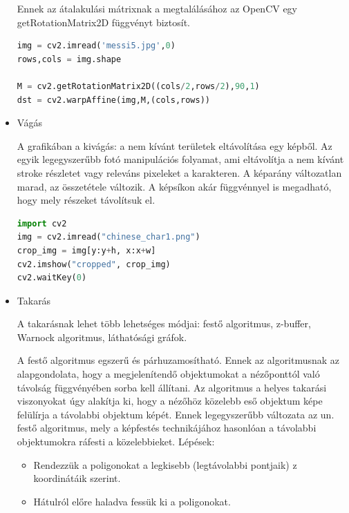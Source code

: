 \begin{itemize}
Ennek az átalakulási mátrixnak a megtalálásához az OpenCV egy getRotationMatrix2D függvényt biztosít.

\begin{lstlisting}[language=Python]
img = cv2.imread('messi5.jpg',0)
rows,cols = img.shape

M = cv2.getRotationMatrix2D((cols/2,rows/2),90,1)
dst = cv2.warpAffine(img,M,(cols,rows))
\end{lstlisting}

\item Vágás

A grafikában a kivágás: a nem kívánt területek eltávolítása egy képből. Az egyik legegyszerűbb fotó manipulációs folyamat, ami eltávolítja a nem kívánt stroke részletet vagy releváns pixeleket a karakteren. A képarány változatlan marad, az összetétele változik. A képsíkon akár függvénnyel is megadható, hogy mely részeket távolítsuk el.

\begin{lstlisting}[language=Python]
import cv2
img = cv2.imread("chinese_char1.png")
crop_img = img[y:y+h, x:x+w]
cv2.imshow("cropped", crop_img)
cv2.waitKey(0)
\end{lstlisting}

\item Takarás

A takarásnak lehet több lehetséges módjai: festő algoritmus, z-buffer, Warnock algoritmus, láthatósági gráfok.

A festő algoritmus egszerű és párhuzamosítható. Ennek az algoritmusnak az alapgondolata, hogy a megjelenítendő objektumokat a nézőponttól való távolság függvényében sorba kell állítani. Az algoritmus a helyes takarási viszonyokat úgy alakítja ki, hogy a nézőhöz közelebb eső objektum képe felülírja a távolabbi objektum képét. Ennek legegyszerűbb változata az un. festő algoritmus, mely a képfestés technikájához hasonlóan a távolabbi objektumokra ráfesti a közelebbieket.
Lépések:
\begin{itemize}
\item Rendezzük a poligonokat a legkisebb (legtávolabbi pontjaik) z koordinátáik szerint.
\item Hátulról előre haladva fessük ki a poligonokat. 
\end{itemize}

\end{itemize}

